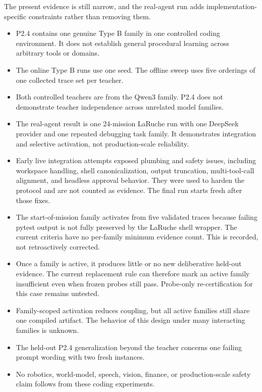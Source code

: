 \documentclass[10pt]{article}
\begin{document}
The present evidence is still narrow, and the real-agent run adds implementation-specific constraints rather than removing them.
\begin{itemize}
  \item P2.4 contains one genuine Type B family in one controlled coding environment. It does not establish general procedural learning across arbitrary tools or domains.
  \item The online Type B runs use one seed. The offline sweep uses five orderings of one collected trace set per teacher.
  \item Both controlled teachers are from the Qwen3 family. P2.4 does not demonstrate teacher independence across unrelated model families.
  \item The real-agent result is one 24-mission LaRuche run with one DeepSeek provider and one repeated debugging task family. It demonstrates integration and selective activation, not production-scale reliability.
  \item Early live integration attempts exposed plumbing and safety issues, including workspace handling, shell canonicalization, output truncation, multi-tool-call alignment, and headless approval behavior. They were used to harden the protocol and are not counted as evidence. The final run starts fresh after those fixes.
  \item The start-of-mission family activates from five validated traces because failing pytest output is not fully preserved by the LaRuche shell wrapper. The current criteria have no per-family minimum evidence count. This is recorded, not retroactively corrected.
  \item Once a family is active, it produces little or no new deliberative held-out evidence. The current replacement rule can therefore mark an active family insufficient even when frozen probes still pass. Probe-only re-certification for this case remains untested.
  \item Family-scoped activation reduces coupling, but all active families still share one compiled artifact. The behavior of this design under many interacting families is unknown.
  \item The held-out P2.4 generalization beyond the teacher concerns one failing prompt wording with two fresh instances.
  \item No robotics, world-model, speech, vision, finance, or production-scale safety claim follows from these coding experiments.
\end{itemize}
\end{document}
